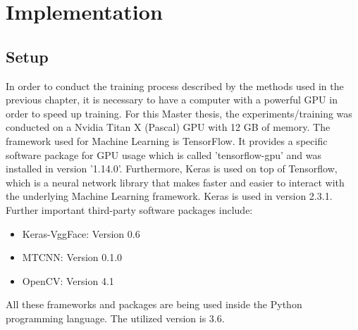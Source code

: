 \chapter{Implementation}
\section{Setup}

In order to conduct the training process described by the methods used in the previous chapter, it is necessary to have a computer with a powerful GPU in order to speed up training. For this Master thesis, the experiments/training was conducted on a Nvidia Titan X (Pascal) GPU with 12 GB of memory. 
\newline\newline
The framework used for Machine Learning is TensorFlow. It provides a specific software package for GPU usage which is called 'tensorflow-gpu' and was installed in version '1.14.0'. Furthermore, Keras is used on top of Tensorflow, which is a neural network library that makes faster and easier to interact with the underlying Machine Learning framework. Keras is used in version 2.3.1.
\newline\newline
Further important third-party software packages include:
\begin{itemize}
    \item Keras-VggFace: Version 0.6
    \item MTCNN:         Version 0.1.0
    \item OpenCV:        Version 4.1
\end{itemize}
All these frameworks and packages are being used inside the Python programming language. The utilized version is 3.6.


